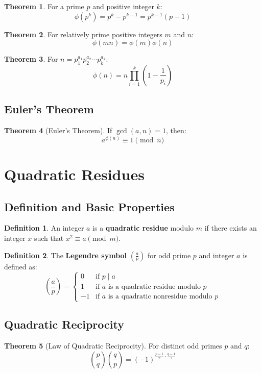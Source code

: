 \documentclass[11pt]{article}
\theoremstyle{definition}
\newtheorem{definition}{Definition}[section]
\newtheorem{theorem}{Theorem}[section]
\begin{document}
\begin{theorem}
For a prime $p$ and positive integer $k$:
$$\phi(p^k) = p^k - p^{k-1} = p^{k-1}(p-1)$$
\end{theorem}

\begin{theorem}
For relatively prime positive integers $m$ and $n$:
$$\phi(mn) = \phi(m)\phi(n)$$
\end{theorem}

\begin{theorem}
For $n = p_1^{a_1} p_2^{a_2} \cdots p_k^{a_k}$:
$$\phi(n) = n \prod_{i=1}^k \left(1 - \frac{1}{p_i}\right)$$
\end{theorem}

\subsection{Euler's Theorem}
\begin{theorem}[Euler's Theorem]
If $\gcd(a,n) = 1$, then:
$$a^{\phi(n)} \equiv 1 \pmod{n}$$
\end{theorem}

\section{Quadratic Residues}

\subsection{Definition and Basic Properties}
\begin{definition}
An integer $a$ is a \textbf{quadratic residue} modulo $m$ if there exists an integer $x$ such that $x^2 \equiv a \pmod{m}$.
\end{definition}

\begin{definition}
The \textbf{Legendre symbol} $\left(\frac{a}{p}\right)$ for odd prime $p$ and integer $a$ is defined as:
$$\left(\frac{a}{p}\right) = \begin{cases}
0 & \text{if } p \mid a \\
1 & \text{if } a \text{ is a quadratic residue modulo } p \\
-1 & \text{if } a \text{ is a quadratic nonresidue modulo } p
\end{cases}$$
\end{definition}

\subsection{Quadratic Reciprocity}
\begin{theorem}[Law of Quadratic Reciprocity]
For distinct odd primes $p$ and $q$:
$$\left(\frac{p}{q}\right)\left(\frac{q}{p}\right) = (-1)^{\frac{p-1}{2} \cdot \frac{q-1}{2}}$$
\end{theorem}
\end{document}

